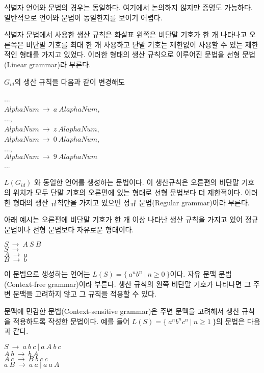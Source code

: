 \documentclass[a4paper]{book}
\begin{document}
식별자 언어와 문법의 경우는 동일하다. 여기에서 논의하지 않지만 증명도
가능하다. 일반적으로 언어와 문법이 동일한지를 보이기 어렵다.


식별자 문법에서 사용한 생산 규칙은 화살표 왼쪽은 비단말 기호가 한 개
나타나고 오른쪽은 비단말 기호를 최대 한 개 사용하고 단말 기호는
제한없이 사용할 수 있는 제한적인 형태를 가지고 있었다. 이러한 형태의
생산 규칙으로 이루어진 문법을 선형 문법(Linear grammar)라
부른다.

$G_{id}$의 생산 규칙을 다음과 같이 변경해도
\begin{center}
  ... \\
  $AlphaNum \ \rightarrow \ a \ AlaphaNum$,\\
  ...,\\
  $AlphaNum \ \rightarrow \ z \ AlaphaNum$, \\
  $AlphaNum \ \rightarrow \ 0 \ AlaphaNum$, \\
  ..., \\
  $AlphaNum \ \rightarrow \ 9 \ AlaphaNum$ \\
  ...
\end{center}
$L(G_{id})$ 와 동일한 언어를 생성하는 문법이다. 이 생산규칙은 오른편의
비단말 기호의 위치가 모두 단말 기호의 오른편에 있는 형태로 선형
문법보다 더 제한적이다. 이러한 형태의 생산 규칙만을 가지고 있으면 정규
문법(Regular grammar)이라 부른다.

아래 예시는 오른편에 비단말 기호가 한 개 이상 나타난 생산 규칙을
가지고 있어 정규 문법이나 선형 문법보다 자유로운 형태이다.
\begin{center}
  $S \ \rightarrow \ A \ S \ B$ \\
  $S \ \rightarrow \ $ \\
  $A \ \rightarrow \ a$ \\
  $B \ \rightarrow \ b$
\end{center}
이 문법으로 생성하는 언어는 $L(S) = \{ \ a^n b^n \ | \ n \geq 0
\ \}$이다. 자유 문맥 문법(Context-free grammar)이라 부른다.  생산
규칙의 왼쪽 비단말 기호가 나타나면 그 주변 문맥을 고려하지 않고 그
규칙을 적용할 수 있다.

문맥에 민감한 문법(Context-sensitive grammar)은 주변 문맥을 고려해서
생산 규칙을 적용하도록 작성한 문법이다. 예를 들어 $L(S) = \{ \ a^n b^n
c^n \ | \ n \geq 1 \ \}$의 문법은 다음과 같다.

\begin{center}
  $S \ \rightarrow \ a \ b \ c \ | \ a \ A \ b \ c$ \\
  $A \ b \ \rightarrow \ b \ A$ \\
  $A \ c \ \rightarrow \ B \ b \ c \ c$ \\
  $a \ B \ \rightarrow \ a \ a \ | \ a \ a \ A$
\end{center}
\end{document}
